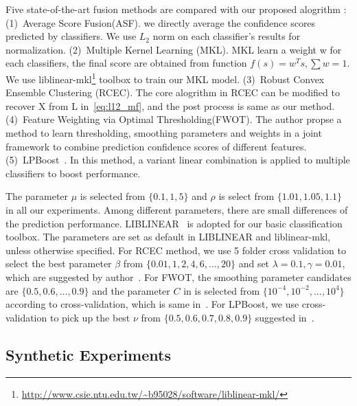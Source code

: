 \documentclass[letterpaper]{article}
\begin{document}


Five state-of-the-art fusion methods are compared with our proposed alogrithm :
(1)~Average Score Fusion(ASF). we directly average the confidence scores predicted by classifiers. We use $L_2$ norm on each classifier's results for normalization.
(2)~Multiple Kernel Learning (MKL).  MKL learn a weight w for each classifiers, the final score are obtained from function $f(s)=w^{T}s, \sum w = 1$. We use liblinear-mkl\footnote{\url{http://www.csie.ntu.edu.tw/~b95028/software/liblinear-mkl/}} toolbox to train our MKL model.
(3)~Robust Convex Ensemble Clustering (RCEC)\cite{gaoijcai2016robust}. The core alogrithm in RCEC can be modified to recover X from L in~\ref{eq:l12_mf}, and the post process is same as our method.
(4)~Feature Weighting via Optimal Thresholding(FWOT)\cite{xuiccv2013feature}. The author propse a method to learn thresholding, smoothing parameters and weights in a joint framework to combine prediction confidence scores of different features.
(5)~LPBoost~\cite{gehler2009feature}. In this method, a variant linear combination is applied to multiple classifiers to boost performance.


The parameter $\mu$ is selected from $\{0.1, 1, 5\}$ and $\rho$ is select from $\{1.01, 1.05, 1.1\}$ in all our experiments.
Among different parameters, there are small differences of the prediction performance.
LIBLINEAR~\cite{fan2008liblinear} is adopted for our basic classification toolbox.
The parameters are set as default in LIBLINEAR and liblinear-mkl, unless otherwise specified.
For RCEC method, we use 5 folder cross validation to select the best parameter $\beta$ from $\{0.01,1,2,4,6,...,20\}$ and set $\lambda = 0.1, \gamma = 0.01$, which are suggested by author~\cite{yiicdm2012robust}.
For FWOT, the smoothing parameter candidates are $\{0.5, 0.6, ... , 0.9\}$ and the parameter $C$ in is selected from $\{10^{-4},10^{-2},...,10^{4}\}$ according to cross-validation, which is same in~\cite{xuiccv2013feature}.
For LPBoost, we use cross-validation to pick up the best $\nu$ from $\{0.5,0.6,0.7,0.8,0.9\}$ suggested in~\cite{xuiccv2013feature}.



\subsection{Synthetic Experiments}
\end{document}
